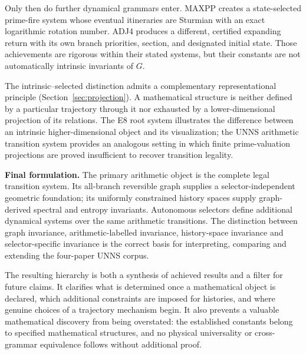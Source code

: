 \documentclass[11pt,a4paper]{article}
\theoremstyle{definition}\newtheorem{definition}[theorem]{Definition}
\begin{document}
Only then do further dynamical grammars enter. MAXPP creates a state-selected prime-fire system whose eventual itineraries are Sturmian with an exact logarithmic rotation number. ADJ4 produces a different, certified expanding return with its own branch priorities, section, and designated initial state. Those achievements are rigorous within their stated systems, but their constants are not automatically intrinsic invariants of $G$.

The intrinsic--selected distinction admits a complementary representational principle (Section~\ref{sec:projection}). A mathematical structure is neither defined by a particular trajectory through it nor exhausted by a lower-dimensional projection of its relations. The E8 root system illustrates the difference between an intrinsic higher-dimensional object and its visualization; the UNNS arithmetic transition system provides an analogous setting in which finite prime-valuation projections are proved insufficient to recover transition legality.

\begin{takeaway}
\textbf{Final formulation.} The primary arithmetic object is the complete legal transition system. Its all-branch reversible graph supplies a selector-independent geometric foundation; its uniformly constrained history spaces supply graph-derived spectral and entropy invariants. Autonomous selectors define additional dynamical systems over the same arithmetic transitions. The distinction between graph invariance, arithmetic-labelled invariance, history-space invariance and selector-specific invariance is the correct basis for interpreting, comparing and extending the four-paper UNNS corpus.
\end{takeaway}

The resulting hierarchy is both a synthesis of achieved results and a filter for future claims. It clarifies what is determined once a mathematical object is declared, which additional constraints are imposed for histories, and where genuine choices of a trajectory mechanism begin. It also prevents a valuable mathematical discovery from being overstated: the established constants belong to specified mathematical structures, and no physical universality or cross-grammar equivalence follows without additional proof.

\appendix
\end{document}
